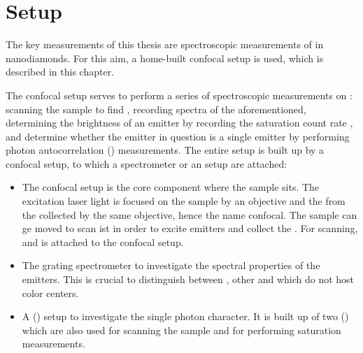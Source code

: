 
\chapter{\Pl Setup}	\label{ch::pl_setup}

	The key measurements of this thesis are spectroscopic measurements of \sivs in nanodiamonds.
	For this aim, a home-built confocal setup is used, which is described in this chapter.

	The confocal setup serves to perform a series of spectroscopic measurements on \fl: scanning the sample to find \sivs, recording \pl spectra of the aforementioned, determining the brightness of an emitter by recording the saturation count rate , and determine whether the emitter in question is a single emitter by performing photon autocorrelation (\gt) measurements.
	The entire setup is built up by a confocal setup, to which a spectrometer or an \HBT setup are attached: 

	\begin{itemize}
		\item The confocal setup is the core component where the sample sits. 
		The  excitation laser light is focused on the sample by an objective and the \fl from the \sivs collected by the same objective, hence the name confocal.
		The sample can ge moved to scan ist in order to excite emitters and collect the \fl.
		For scanning, and \apd is attached to the confocal setup.
		\item The grating spectrometer to investigate the spectral properties of the emitters. This is crucial to distinguish between \sivs, other \ccs and \nds which do not host color centers.
		\item A \keyword{\HBT} (\hbt) setup to investigate the single photon character. It is built up of two \apds (\APDs) which are also used for scanning the sample and for performing saturation measurements.
	\end{itemize}

